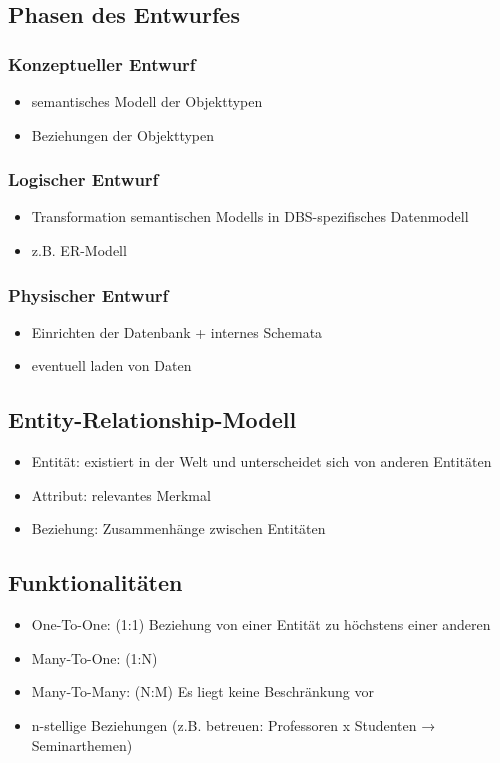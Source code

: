 \documentclass[a4paper]{article}
\begin{document}
\subsection{Phasen des Entwurfes}
\subsubsection{Konzeptueller Entwurf}
\begin{itemize}
    \item semantisches Modell der Objekttypen
    \item Beziehungen der Objekttypen
\end{itemize}

\subsubsection{Logischer Entwurf}
\begin{itemize}
    \item Transformation semantischen Modells in DBS-spezifisches Datenmodell
    \item z.B. ER-Modell
\end{itemize}

\subsubsection{Physischer Entwurf}
\begin{itemize}
    \item Einrichten der Datenbank + internes Schemata
    \item eventuell laden von Daten
\end{itemize}

\subsection{Entity-Relationship-Modell}
\begin{itemize}
    \item Entität: existiert in der Welt und unterscheidet sich von anderen Entitäten
    \item Attribut: relevantes Merkmal
    \item Beziehung: Zusammenhänge zwischen Entitäten
\end{itemize}


\subsection{Funktionalitäten}
\begin{itemize}
    \item One-To-One: (1:1) Beziehung von einer Entität zu höchstens einer anderen  
    \item Many-To-One: (1:N) 
    \item Many-To-Many: (N:M) Es liegt keine Beschränkung vor
    \item n-stellige Beziehungen (z.B. betreuen: Professoren x Studenten → Seminarthemen)
\end{itemize}
\end{document}
